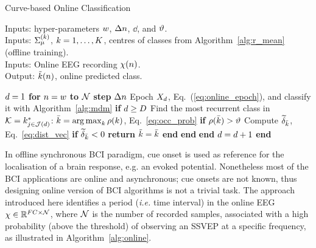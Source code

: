 \begin{algorithm}
\caption{Curve-based Online Classification}
\label{alg:online}
	Inputs: hyper-parameters $w$, $\Delta n$, $\dd$, and $\vartheta$.\\
	Inputs: $\Sigma_{\mu}^{(k)}$, $k = 1, \ldots, K$, centres of classes from Algorithm~\ref{alg:r_mean} (offline training). \\
	Inputs: Online EEG recording $\chi(n)$. \\
	Output: $\tilde{k}(n)$, online predicted class.
	\begin{algorithmic}[1]
	\State $d=1$
	\State \textbf{for} $n = w$ \textbf{to} $\mathcal{N}$ \textbf{step} $\Delta n$
	\State \quad Epoch $X_{\operatorname{\text{\ensuremath{d}}}}$, Eq.~(\ref{eq:online_epoch}), and classify it with Algorithm~\ref{alg:mdm}
	\label{op3:epoch_and_classify}
	\State \quad \textbf{if} $d \geq D$ %
	\label{op3:test_len}
	\State \quad \quad Find the most recurrent class in $\mathcal{K} = k^*_{j \in \mathcal{J}(d)}$:
	$\bar{k} = \operatorname*{arg\,max}_{k} \rho(k)$, Eq.~\eqref{eq:occ_prob}
	\label{op3:get_rho}
	\State \quad \quad \textbf{if} $\rho(\bar{k})>\vartheta$
	\label{op3:test_rho}
	\State \quad \quad \quad Compute $\widetilde{\delta}_{\bar{k}}$, Eq.~\eqref{eq:dist_vec} %
	\label{op3:get_disvec}
	\State \quad \quad \quad \textbf{if} $\widetilde{\delta}_{\bar{k}} < 0$ 
	\label{op3:test_disvec}
	\State \quad \quad \quad \quad \textbf{return} $\tilde{k} = \bar{k}$
	\label{op3:valid_class}
	\State \quad \quad \quad \textbf{end}
	\State \quad \quad \textbf{end}
	\State \quad \textbf{end}
	\State \quad $d = d+1$
	\label{op3:increment_d}
	\State \textbf{end}
	\end{algorithmic}
\end{algorithm}



In offline synchronous BCI paradigm, cue onset is used as reference for the localisation of a brain response, e.g. an evoked potential. 
Nonetheless most of the BCI applications are online and asynchronous; cue onsets are not known, thus designing online version of BCI algorithms %
is not a trivial task. 
The approach introduced here identifies a period (\textit{i.e.} time interval) in the online EEG $\chi \in \mathbb{R}^{FC\times\mathcal{N}}$, where $\mathcal{N}$ is the number of recorded samples, associated with a high probability (above the threshold) of observing an SSVEP at a specific frequency, as illustrated in Algorithm~\ref{alg:online}. %
  
